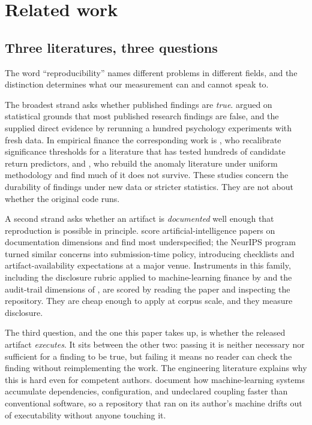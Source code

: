 \section{Related work}\label{sec:related}

\subsection{Three literatures, three questions}\label{sec:three_literatures}

The word ``reproducibility'' names different problems in different fields, and
the distinction determines what our measurement can and cannot speak to.

The broadest strand asks whether published findings are \emph{true}.
\citet{Ioannidis2005} argued on statistical grounds that most published research
findings are false, and the \citet{OpenScienceCollaboration2015} supplied direct
evidence by rerunning a hundred psychology experiments with fresh data. In
empirical finance the corresponding work is \citet{HarveyLiuZhu2016}, who
recalibrate significance thresholds for a literature that has tested hundreds of
candidate return predictors, and \citet{HouXueZhang2020}, who rebuild the
anomaly literature under uniform methodology and find much of it does not
survive. These studies concern the durability of findings under new data or
stricter statistics. They are not about whether the original code runs.

A second strand asks whether an artifact is \emph{documented} well enough that
reproduction is possible in principle. \citet{GundersenKjensmo2018} score
artificial-intelligence papers on documentation dimensions and find most
underspecified; the \citet{PineauReproducibility2021} NeurIPS program turned
similar concerns into submission-time policy, introducing checklists and
artifact-availability expectations at a major venue. Instruments in this family,
including the disclosure rubric applied to machine-learning finance by
\citet{Khan2026Survey} and the audit-trail dimensions of
\citet{Khan2026MrAudit}, are scored by reading the paper and inspecting the
repository. They are cheap enough to apply at corpus scale, and they measure
disclosure.

The third question, and the one this paper takes up, is whether the released
artifact \emph{executes}. It sits between the other two: passing it is neither
necessary nor sufficient for a finding to be true, but failing it means no reader
can check the finding without reimplementing the work. The engineering literature
explains why this is hard even for competent authors.
\citet{SculleyTechnicalDebt2015} document how machine-learning systems accumulate
dependencies, configuration, and undeclared coupling faster than conventional
software, so a repository that ran on its author's machine drifts out of
executability without anyone touching it.

